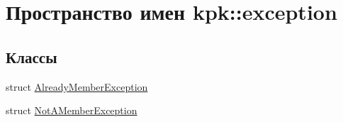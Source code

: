 \hypertarget{namespacekpk_1_1exception}{}\section{Пространство имен kpk\+:\+:exception}
\label{namespacekpk_1_1exception}
\subsection*{Классы}
\begin{DoxyCompactItemize}
\item 
struct \hyperlink{structkpk_1_1exception_1_1_already_member_exception}{Already\+Member\+Exception}
\item 
struct \hyperlink{structkpk_1_1exception_1_1_not_a_member_exception}{Not\+A\+Member\+Exception}
\end{DoxyCompactItemize}

